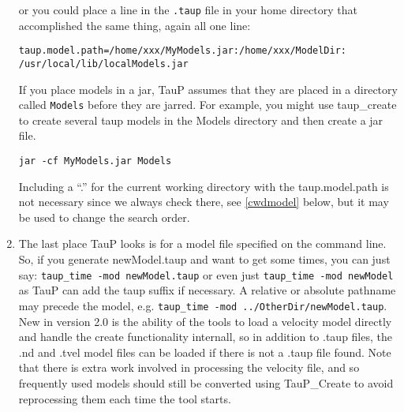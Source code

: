 \begin{enumerate}
or you could place a line in the \texttt{.taup} file in your home directory 
that accomplished the same thing, again all one line:

\begin{verbatim}
taup.model.path=/home/xxx/MyModels.jar:/home/xxx/ModelDir:
/usr/local/lib/localModels.jar
\end{verbatim}

If you place models in a jar, TauP assumes that they are placed
in a directory called \texttt{Models} before they are jarred. 
For example, you might
use taup\_create to create several taup models in the Models directory 
and then create a jar file.

\texttt{jar -cf MyModels.jar Models}

Including a ``.'' for the current working directory with the taup.model.path 
is not necessary since we
always check there, see \ref{cwdmodel} below, but it may be used to 
change the search order.

\item \label{cwdmodel} The last place TauP looks is for a model file specified 
on the command line.
So, if you generate newModel.taup and want to get some times, you can just say:
\texttt{taup\_time -mod newModel.taup}
or even just
\texttt{taup\_time -mod newModel}
as TauP can add the taup suffix if necessary. A relative or absolute pathname
may precede the model, e.g. 
\texttt{taup\_time -mod ../OtherDir/newModel.taup}.
New in version 2.0 is the ability of the tools to load a velocity model directly
and handle the create functionality internall, so in addition to .taup files,
the .nd and .tvel model files can be loaded if there is not a .taup file found.
Note that there is extra work involved in processing the velocity file, and so
frequently used models should still be converted using TauP\_Create to avoid 
reprocessing them each time the tool starts.

\end{enumerate}
